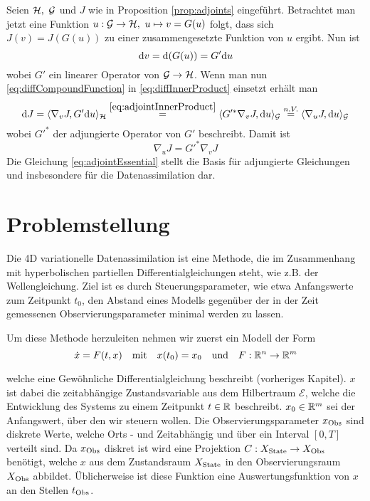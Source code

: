 Seien $\mathcal{H},~\mathcal{G}$ und $J$ wie in Proposition \ref{prop:adjoints} eingeführt. Betrachtet man jetzt eine Funktion $u:\mathcal{G} \to \mathcal{H}, ~u\mapsto v = G(u)$ folgt, dass sich $J(v) = J(G(u))$ zu einer zusammengesetzte Funktion von $u$ ergibt. Nun ist 
\begin{equation}
\label{eq:diffCompoundFunction}
\text{d} v = \text{d}(G(u)) = G'\text{d} u
\end{equation}
wobei $G'$ ein linearer Operator von $\mathcal{G}\to\mathcal{H}$. Wenn man nun \eqref{eq:diffCompoundFunction} in \eqref{eq:diffInnerProduct} einsetzt erhält man 
\begin{equation}
 \text{d} J = \langle \nabla_v J,G'\text{d} u\rangle_{\mathcal{H}} \overset{\eqref{eq:adjointInnerProduct}}{=}  \langle G'^* \nabla_v J,\text{d} u\rangle_{\mathcal{G}} \overset{n.V.}{=} \langle \nabla_u J,\text{d} u\rangle_{\mathcal{G}} 
\end{equation}
wobei $G'^*$ der adjungierte Operator von $G'$ beschreibt. Damit ist 
\begin{equation}
\label{eq:adjointEssential}
\nabla_u J = G'^*\nabla_v J
\end{equation} 
Die Gleichung \eqref{eq:adjointEssential} stellt die Basis für adjungierte Gleichungen und insbesondere für die Datenassimilation dar. 



\section{Problemstellung}
Die 4D variationelle Datenassimilation ist eine Methode, die im Zusammenhang mit hyperbolischen partiellen Differentialgleichungen steht, wie z.B. der Wellengleichung. Ziel ist es durch Steuerungsparameter, wie etwa Anfangswerte zum Zeitpunkt $t_0$, den Abstand eines Modells gegenüber der in der Zeit gemessenen Observierungsparameter minimal werden zu lassen. 


Um diese Methode herzuleiten nehmen wir zuerst ein Modell der Form
\begin{equation}
\label{eq:odemodel}
 \dot{x} = F(t,x)\quad \text{mit} \quad x(t_0) = x_0 \quad \text{und}\quad F:\mathbb{R}^n\to \mathbb{R}^m
\end{equation}
  
welche eine Gewöhnliche Differentialgleichung beschreibt (vorheriges Kapitel). $x$ ist dabei die zeitabhängige Zustandsvariable aus dem Hilbertraum $\mathcal{E}$, welche die Entwicklung des Systems zu einem Zeitpunkt $t\in \mathbb{R}$ beschreibt. 
$x_0 \in \mathbb{R}^m$ sei der Anfangswert, über den wir steuern wollen.
Die Observierungsparameter $x_{\text{Obs}}$ sind diskrete Werte, welche Orts - und Zeitabhängig und über ein Interval $[0,T]$ verteilt sind. Da $x_{\text{Obs}}$ diskret ist wird eine Projektion $C:X_{\text{State}}\to X_{\text{Obs}}$ benötigt, welche $x$ aus dem Zustandsraum $X_{\text{State}}$ in den Observierungsraum $X_{\text{Obs}}$ abbildet. Üblicherweise ist diese Funktion eine Auswertungsfunktion von $x$ an den Stellen $t_{\text{Obs}}$.

